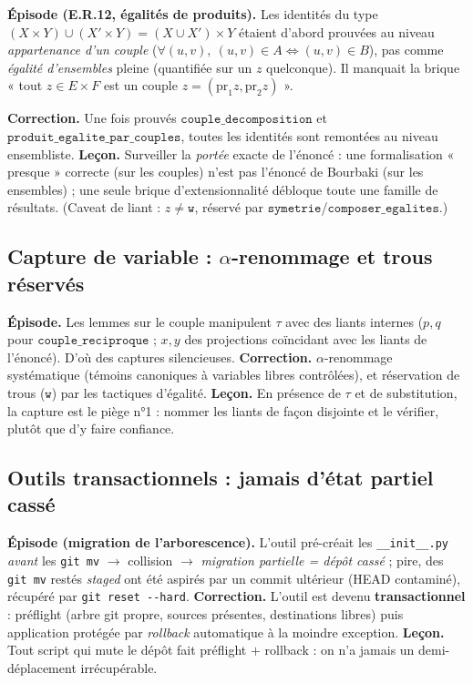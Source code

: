 \textbf{Épisode (E.R.12, égalités de produits).} Les identités du type
$(X\times Y)\cup(X'\times Y)=(X\cup X')\times Y$ étaient d'abord prouvées au
niveau \emph{appartenance d'un couple} ($\forall(u,v),\ (u,v)\in A\Leftrightarrow
(u,v)\in B$), pas comme \emph{égalité d'ensembles} pleine (quantifiée sur un $z$
quelconque). Il manquait la brique « tout $z\in E\times F$ est un couple
$z=(\mathrm{pr}_1 z,\mathrm{pr}_2 z)$ ».

\textbf{Correction.} Une fois prouvés $\texttt{couple\_decomposition}$ et
$\texttt{produit\_egalite\_par\_couples}$, toutes les identités sont remontées au
niveau ensembliste. \textbf{Leçon.} Surveiller la \emph{portée} exacte de
l'énoncé : une formalisation « presque » correcte (sur les couples) n'est pas
l'énoncé de Bourbaki (sur les ensembles) ; une seule brique d'extensionnalité
débloque toute une famille de résultats. (Caveat de liant : $z\neq\texttt{w}$,
réservé par $\texttt{symetrie}$/$\texttt{composer\_egalites}$.)

\subsection{Capture de variable : $\alpha$-renommage et trous réservés}

\textbf{Épisode.} Les lemmes sur le couple manipulent $\tau$ avec des liants
internes ($p,q$ pour $\texttt{couple\_reciproque}$ ; $x,y$ des projections
coïncidant avec les liants de l'énoncé). D'où des captures silencieuses.
\textbf{Correction.} $\alpha$-renommage systématique (témoins canoniques à
variables libres contrôlées), et réservation de trous ($\texttt{w}$) par les
tactiques d'égalité. \textbf{Leçon.} En présence de $\tau$ et de substitution,
la capture est le piège n°1 : nommer les liants de façon disjointe et le
vérifier, plutôt que d'y faire confiance.

\subsection{Outils transactionnels : jamais d'état partiel cassé}

\textbf{Épisode (migration de l'arborescence).} L'outil pré-créait les
\texttt{\_\_init\_\_.py} \emph{avant} les \texttt{git mv} $\to$ collision $\to$
\emph{migration partielle = dépôt cassé} ; pire, des \texttt{git mv} restés
\emph{staged} ont été aspirés par un commit ultérieur (HEAD contaminé), récupéré
par \texttt{git reset -{}-hard}. \textbf{Correction.} L'outil est devenu
\textbf{transactionnel} : préflight (arbre git propre, sources présentes,
destinations libres) puis application protégée par \emph{rollback} automatique à
la moindre exception. \textbf{Leçon.} Tout script qui mute le dépôt fait
préflight $+$ rollback : on n'a jamais un demi-déplacement irrécupérable.

